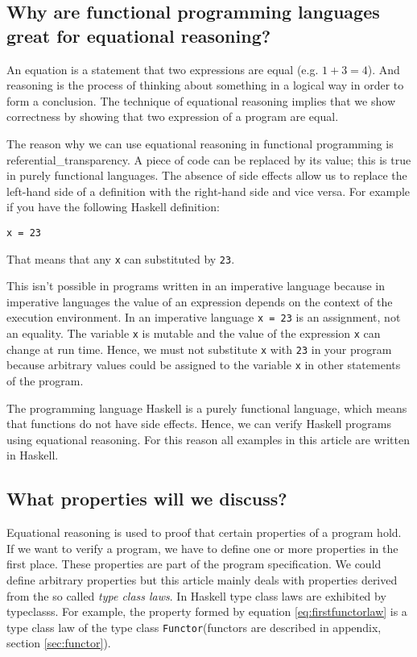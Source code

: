 \subsection{Why are functional programming languages great for equational reasoning?}

An equation is a statement that two expressions are equal (e.g. $1 + 3 = 4$). And reasoning is the process of thinking about something in a logical way in order to form a conclusion. The technique of equational reasoning implies that we show correctness by showing that two expression of a program are equal. 

The reason why we can use equational reasoning in functional programming is \gls{referential_transparency}. A piece of code can be replaced by its value; this is true in purely functional languages. The absence of side effects allow us to replace the left-hand side of a definition with the right-hand side and vice versa. For example if you have the following Haskell definition:
\begin{verbatim}
x = 23
\end{verbatim}
That means that any \verb|x| can substituted by \verb|23|.

This isn't possible in programs written in an imperative language because in imperative languages the value of an expression depends on the context of the execution environment. In an imperative language \verb|x = 23| is an assignment, not an equality. The variable \verb|x| is mutable and the value of the expression \verb|x| can change at run time. Hence, we must not substitute \verb|x| with \verb|23| in your program because arbitrary values could be assigned to the variable \verb|x| in other statements of the program.

The programming language Haskell is a purely functional language, which means that functions do not have side effects. Hence, we can verify Haskell programs using equational reasoning. For this reason all examples in this article are written in Haskell.

\subsection{What properties will we discuss?}

Equational reasoning is used to proof that certain properties of a program hold. If we want to verify a program, we have to define one or more properties in the first place. These properties are part of the program specification. We could define arbitrary properties but this article mainly deals with properties derived from the so called \emph{type class laws}. In Haskell type class laws are exhibited by \glspl{typeclass}. For example, the property formed by equation \ref{eq:firstfunctorlaw} is a type class law of the type class \verb|Functor|(functors are described in appendix, section \ref{sec:functor}).

